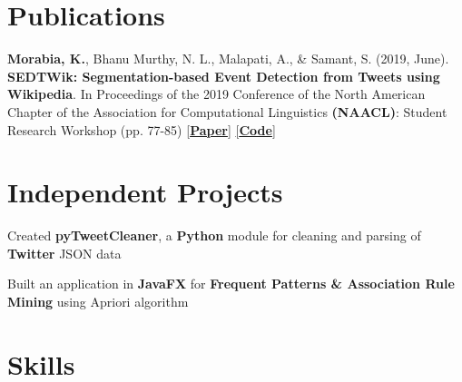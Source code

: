 \documentclass[]{Keval-resume}
\begin{document}
\section{Publications} 
\hrulefill
\postsectionsep 

\textbullet{} \textbf{Morabia, K.}, Bhanu Murthy, N. L., Malapati, A., \& Samant, S. (2019, June). \textbf{SEDTWik: Segmentation-based Event Detection from Tweets using Wikipedia}. In Proceedings of the 2019 Conference of the North American Chapter of the Association for Computational Linguistics \textbf{(NAACL)}: Student Research Workshop (pp. 77-85) \href{https://www.aclweb.org/anthology/papers/N/N19/N19-3011/}{[\textbf{Paper}]} \href{https://github.com/kevalmorabia97/SEDTWik-Event-Detection-from-Tweets}{[\textbf{Code}]}
\sectionsep

\section{Independent Projects}
\hrulefill
\postsectionsep

\textbullet{} Created \textbf{pyTweetCleaner}, a \textbf{Python} module for cleaning and parsing of \textbf{Twitter} JSON data

\textbullet{} Built an application in \textbf{JavaFX} for \textbf{Frequent Patterns \& Association Rule Mining} using Apriori algorithm






\sectionsep

\section{Skills} 
\hrulefill
\postsectionsep
\end{document}
